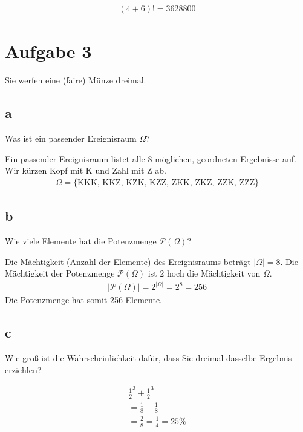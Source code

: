 \begin{align*}
    (4 + 6)! = 3628800
\end{align*}

\section{Aufgabe 3}
Sie werfen eine (faire) Münze dreimal.

\subsection{a}
Was ist ein passender Ereignisraum $\Omega$?

Ein passender Ereignisraum listet alle 8 möglichen, geordneten Ergebnisse auf. Wir kürzen Kopf mit K und Zahl mit Z ab.
\begin{align*}
    \Omega = \{ 
        \text{KKK, } 
        \text{KKZ, } 
        \text{KZK, } 
        \text{KZZ, } 
        \text{ZKK, } 
        \text{ZKZ, } 
        \text{ZZK, } 
        \text{ZZZ} 
    \}
\end{align*}

\subsection{b}
Wie viele Elemente hat die Potenzmenge $\mathcal{P}(\Omega)$?

Die Mächtigkeit (Anzahl der Elemente) des Ereignisraums beträgt $|\Omega| = 8$.
Die Mächtigkeit der Potenzmenge $\mathcal{P}(\Omega)$ ist $2$ hoch die Mächtigkeit von $\Omega$.
\begin{align*}
    |\mathcal{P}(\Omega)| = 2^{|\Omega|} = 2^8 = 256
\end{align*}
Die Potenzmenge hat somit 256 Elemente.

\subsection{c}
Wie groß ist die Wahrscheinlichkeit dafür, dass Sie dreimal dasselbe Ergebnis erziehlen?

\begin{align*}
    \frac{1}{2}^3 + \frac{1}{2}^3 \\
    = \frac{1}{8} + \frac{1}{8} \\
    = \frac{2}{8} = \frac{1}{4} = 25\%
\end{align*}